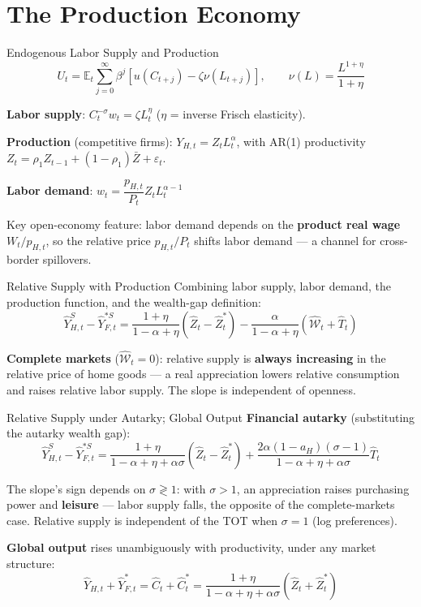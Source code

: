 \documentclass[blue]{beamer}
\newcommand{\E}{\mathbb{E}}
\begin{document}
\section{The Production Economy}

\begin{frame}{Endogenous Labor Supply and Production}
\[
U_t = \E_t\sum_{j=0}^{\infty}\beta^j\left[u(C_{t+j}) - \zeta\nu(L_{t+j})\right], \qquad \nu(L) = \frac{L^{1+\eta}}{1+\eta}
\]

\textbf{Labor supply}: $C_t^{-\sigma}w_t = \zeta L_t^{\eta}$ ($\eta$ = inverse Frisch elasticity).

\textbf{Production} (competitive firms): $Y_{H,t} = Z_tL_t^{\alpha}$, with AR(1) productivity $Z_t = \rho_1 Z_{t-1} + (1-\rho_1)\bar{Z} + \varepsilon_t$.

\textbf{Labor demand}: $w_t = \dfrac{p_{H,t}}{P_t}Z_t L_t^{\alpha-1}$

\bigskip
Key open-economy feature: labor demand depends on the \textbf{product real wage} $W_t/p_{H,t}$, so the relative price $p_{H,t}/P_t$ shifts labor demand --- a channel for cross-border spillovers.
\end{frame}

\begin{frame}{Relative Supply with Production}
Combining labor supply, labor demand, the production function, and the wealth-gap definition:
\[
\hat{Y}^S_{H,t} - \hat{Y}^{*S}_{F,t} = \frac{1+\eta}{1-\alpha+\eta}\left(\hat{Z}_t - \hat{Z}_t^*\right) - \frac{\alpha}{1-\alpha+\eta}\left(\hat{\mathcal{W}}_t + \hat{T}_t\right)
\]

\textbf{Complete markets} ($\hat{\mathcal{W}}_t = 0$): relative supply is \textbf{always increasing} in the relative price of home goods --- a real appreciation lowers relative consumption and raises relative labor supply. The slope is independent of openness.
\end{frame}

\begin{frame}{Relative Supply under Autarky; Global Output}
\textbf{Financial autarky} (substituting the autarky wealth gap):
\[
\hat{Y}^S_{H,t} - \hat{Y}^{*S}_{F,t} = \frac{1+\eta}{1-\alpha+\eta+\alpha\sigma}\left(\hat{Z}_t - \hat{Z}_t^*\right) + \frac{2\alpha(1-a_H)(\sigma-1)}{1-\alpha+\eta+\alpha\sigma}\hat{T}_t
\]

The slope's sign depends on $\sigma \gtrless 1$: with $\sigma > 1$, an appreciation raises purchasing power and \textbf{leisure} --- labor supply falls, the opposite of the complete-markets case. Relative supply is independent of the TOT when $\sigma = 1$ (log preferences).

\bigskip
\textbf{Global output} rises unambiguously with productivity, under any market structure:
\[
\hat{Y}_{H,t} + \hat{Y}^*_{F,t} = \hat{C}_t + \hat{C}_t^* = \frac{1+\eta}{1-\alpha+\eta+\alpha\sigma}\left(\hat{Z}_t + \hat{Z}_t^*\right)
\]
\end{frame}
\end{document}
